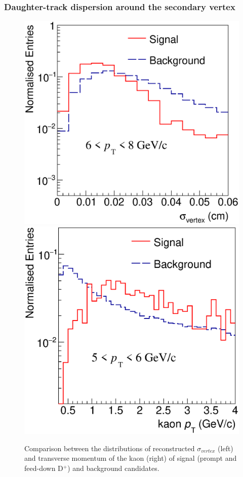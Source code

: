 \documentclass[b5paper,10pt,twoside,oldstyle,classica]{toptesi}
\begin{document}
\subsubsection{Daughter-track dispersion around the secondary vertex}
\begin{figure}[b]
\begin{center}
{\includegraphics[scale = 0.32]{SigVtxComp_6-8.eps}}
\hspace{-0.5cm}
{\includegraphics[scale = 0.32]{KaonPtComp_5-6.eps}}
\caption{Comparison between the distributions of reconstructed $\sigma_{vertex}$ (left) and transverse momentum of the kaon (right) of signal (prompt and feed-down D$^+$) and background candidates.}
\label{sigvtx}
\end{center}
\end{figure}
\end{document}
